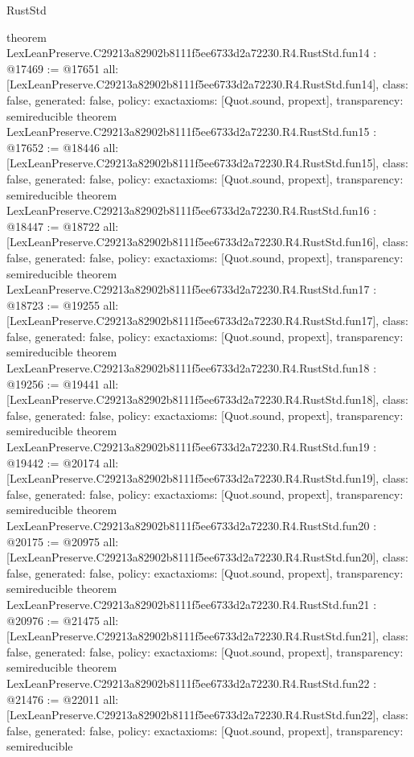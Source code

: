 \begin{lexlean}{RustStd}
\begin{coremodule}
{}
theorem LexLeanPreserve.C29213a82902b8111f5ee6733d2a72230.R4.RustStd.fun14 : @17469 := @17651 {
  all: [LexLeanPreserve.C29213a82902b8111f5ee6733d2a72230.R4.RustStd.fun14],
  class: false,
  generated: false,
  policy: exact{axioms: [Quot.sound, propext]},
  transparency: semireducible
}
theorem LexLeanPreserve.C29213a82902b8111f5ee6733d2a72230.R4.RustStd.fun15 : @17652 := @18446 {
  all: [LexLeanPreserve.C29213a82902b8111f5ee6733d2a72230.R4.RustStd.fun15],
  class: false,
  generated: false,
  policy: exact{axioms: [Quot.sound, propext]},
  transparency: semireducible
}
theorem LexLeanPreserve.C29213a82902b8111f5ee6733d2a72230.R4.RustStd.fun16 : @18447 := @18722 {
  all: [LexLeanPreserve.C29213a82902b8111f5ee6733d2a72230.R4.RustStd.fun16],
  class: false,
  generated: false,
  policy: exact{axioms: [Quot.sound, propext]},
  transparency: semireducible
}
theorem LexLeanPreserve.C29213a82902b8111f5ee6733d2a72230.R4.RustStd.fun17 : @18723 := @19255 {
  all: [LexLeanPreserve.C29213a82902b8111f5ee6733d2a72230.R4.RustStd.fun17],
  class: false,
  generated: false,
  policy: exact{axioms: [Quot.sound, propext]},
  transparency: semireducible
}
theorem LexLeanPreserve.C29213a82902b8111f5ee6733d2a72230.R4.RustStd.fun18 : @19256 := @19441 {
  all: [LexLeanPreserve.C29213a82902b8111f5ee6733d2a72230.R4.RustStd.fun18],
  class: false,
  generated: false,
  policy: exact{axioms: [Quot.sound, propext]},
  transparency: semireducible
}
theorem LexLeanPreserve.C29213a82902b8111f5ee6733d2a72230.R4.RustStd.fun19 : @19442 := @20174 {
  all: [LexLeanPreserve.C29213a82902b8111f5ee6733d2a72230.R4.RustStd.fun19],
  class: false,
  generated: false,
  policy: exact{axioms: [Quot.sound, propext]},
  transparency: semireducible
}
theorem LexLeanPreserve.C29213a82902b8111f5ee6733d2a72230.R4.RustStd.fun20 : @20175 := @20975 {
  all: [LexLeanPreserve.C29213a82902b8111f5ee6733d2a72230.R4.RustStd.fun20],
  class: false,
  generated: false,
  policy: exact{axioms: [Quot.sound, propext]},
  transparency: semireducible
}
theorem LexLeanPreserve.C29213a82902b8111f5ee6733d2a72230.R4.RustStd.fun21 : @20976 := @21475 {
  all: [LexLeanPreserve.C29213a82902b8111f5ee6733d2a72230.R4.RustStd.fun21],
  class: false,
  generated: false,
  policy: exact{axioms: [Quot.sound, propext]},
  transparency: semireducible
}
theorem LexLeanPreserve.C29213a82902b8111f5ee6733d2a72230.R4.RustStd.fun22 : @21476 := @22011 {
  all: [LexLeanPreserve.C29213a82902b8111f5ee6733d2a72230.R4.RustStd.fun22],
  class: false,
  generated: false,
  policy: exact{axioms: [Quot.sound, propext]},
  transparency: semireducible
}
\end{coremodule}
\end{lexlean}
